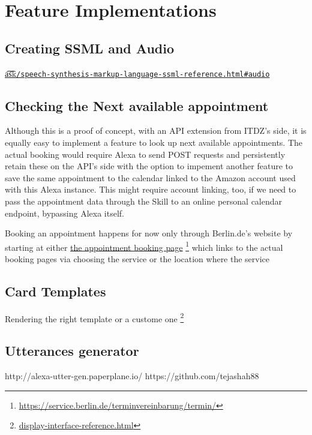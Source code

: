 \section[Features]{Feature Implementations}


\subsection*{Creating SSML and Audio}


\href{https://developer.amazon.com/docs/custom-skills/speech-synthesis-markup-language-ssml-reference.html#audio}{\t{a\t{sk}}\lstinline|/speech-synthesis-markup-language-ssml-reference.html#audio|}



\subsection*{Checking the Next available appointment}

Although this is a proof of concept, with an API extension from ITDZ's side, it is equally easy to implement a feature to look up next available appointments.
The actual booking would require Alexa to send POST requests and persistently retain these on the API's side with the option to impement another feature to save the same appointment to the calendar linked to the Amazon account used with this Alexa instance. This might require account linking, too, if we need to pass the appointment data through the Skill to an online personal calendar endpoint, bypassing Alexa itself.

Booking an appointment happens for now only through Berlin.de's website by starting at either \href{https://service.berlin.de/terminvereinbarung/termin/}{the appointment booking page} \footnote{\url{https://service.berlin.de/terminvereinbarung/termin/}} which links to the actual booking pages via choosing the service or the location where the service 



\subsection*{Card Templates}

Rendering the right template or a custome one \footnote{\href{https://developer.amazon.com/docs/custom-skills/display-interface-reference.html}{display-interface-reference.html}}

\subsection*{Utterances generator}
http://alexa-utter-gen.paperplane.io/
https://github.com/tejashah88


